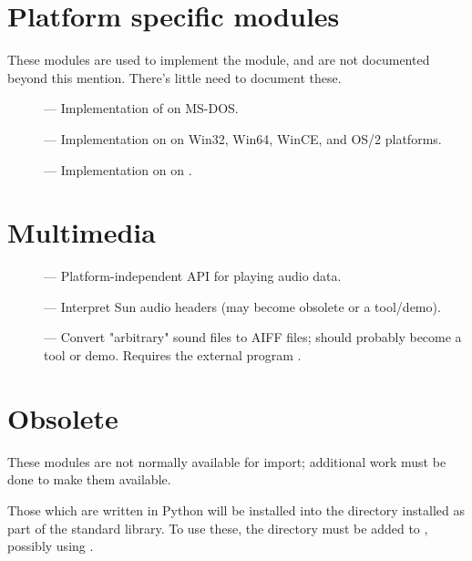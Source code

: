 \section{Platform specific modules}

These modules are used to implement the  module,
and are not documented beyond this mention.  There's little need to
document these.

\begin{description}
\item[]
--- Implementation of  on MS-DOS.

\item[]
--- Implementation on  on Win32, Win64, WinCE, and
OS/2 platforms.

\item[]
--- Implementation on  on \POSIX.
\end{description}


\section{Multimedia}

\begin{description}
\item[]
--- Platform-independent API for playing audio data.

\item[]
--- Interpret Sun audio headers (may become obsolete or a tool/demo).

\item[]
--- Convert "arbitrary" sound files to AIFF files; should probably
become a tool or demo.  Requires the external program .
\end{description}


\section{Obsolete \label{obsolete-modules}}

These modules are not normally available for import; additional work
must be done to make them available.

Those which are written in Python will be installed into the directory 
 installed as part of the standard library.  To use
these, the directory must be added to , possibly using
.

